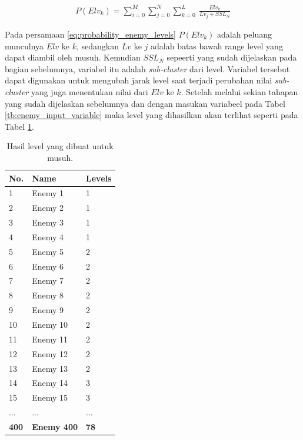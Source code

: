 \begin{equation}\label{eq:probability_enemy_levels}
\begin{split}
P(Elv_{k}) = \sum_{i = 0}^{M} \sum_{j = 0}^{N} \sum_{k = 0}^{L}\ \frac{Elv_{k}}{Lv_{j} + SSL_{N}}
\end{split}
\end{equation}

Pada persamaan \ref{eq:probability_enemy_levels} $P(Elv_{k})$ adalah peluang munculnya $Elv$ ke $k$, sedangkan $Lv$ ke $j$ adalah batas bawah range level yang dapat diambil oleh musuh. Kemudian $SSL_{N}$ sepeerti yang sudah dijelaskan pada bagian sebelumnya, variabel itu adalah \textit{sub-cluster} dari level. Variabel tersebut dapat digunakan untuk mengubah jarak level saat terjadi perubahan nilai \textit{sub-cluster} yang juga menentukan nilai dari $Elv$ ke $k$. Setelah melalui sekian tahapan yang sudah dijelaskan sebelumnya dan dengan masukan variabeel pada Tabel \ref{tb:enemy_input_variable} maka level yang dihasilkan akan terlihat seperti pada Tabel \ref{tb:enemy_level_distrib}.
\vspace{1ex}

\begin{table}[!h]
	\centering
	\caption{Hasil level yang dibuat untuk musuh.}
	\label{tb:enemy_level_distrib}
	\begin{tabular}{|l|l|l|}
		\hline
		\textbf{No.} & \textbf{Name} & \textbf{Levels} \\ \hline
		1 & Enemy 1 & 1 \\ \hline
		2 & Enemy 2 & 1 \\ \hline
		3 & Enemy 3 & 1 \\ \hline
		4 & Enemy 4 & 1 \\ \hline
		5 & Enemy 5 & 2 \\ \hline
		6 & Enemy 6 & 2 \\ \hline
		7 & Enemy 7 & 2 \\ \hline
		8 & Enemy 8 & 2 \\ \hline
		9 & Enemy 9 & 2 \\ \hline
		10 & Enemy 10 & 2 \\ \hline
		11 & Enemy 11 & 2 \\ \hline
		12 & Enemy 12 & 2 \\ \hline
		13 & Enemy 13 & 2 \\ \hline
		14 & Enemy 14 & 3 \\ \hline
		15 & Enemy 15 & 3 \\ \hline
		... & ... & ... \\ \hline
		\textbf{400} & \textbf{Enemy 400} & \textbf{78} \\ \hline
	\end{tabular}
	\vspace{1ex}
\end{table}



